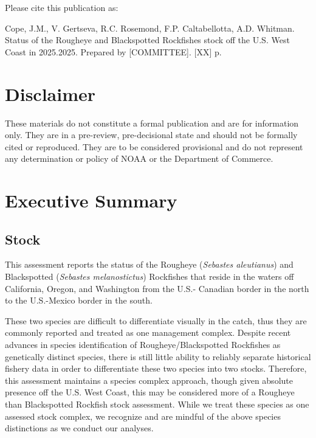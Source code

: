 \documentclass[
]{scrartcl}
\renewcommand*\contentsname{Table of contents}
\newcommand\contentsname{Table of contents}
\begin{document}
\renewcommand*\contentsname{Table of contents}
{
\hypersetup{linkcolor=}
\setcounter{tocdepth}{3}
\tableofcontents
}

\newpage{}

Please cite this publication as:

Cope, J.M., V. Gertseva, R.C. Rosemond, F.P. Caltabellotta, A.D.
Whitman. Status of the Rougheye and Blackspotted Rockfishes stock off
the U.S. West Coast in 2025.2025. Prepared by {[}COMMITTEE{]}. {[}XX{]}
p.

\newpage{}

\section*{Disclaimer}\label{disclaimer}

These materials do not constitute a formal publication and are for
information only. They are in a pre-review, pre-decisional state and
should not be formally cited or reproduced. They are to be considered
provisional and do not represent any determination or policy of NOAA or
the Department of Commerce.

\newpage{}

\setcounter{page}{1}

\renewcommand{\thetable}{\roman{table}}
\renewcommand{\thefigure}{\roman{figure}}

\setlength\parskip{0.5em plus 0.1em minus 0.2em}

\section{Executive Summary}\label{executive-summary}

\subsection{Stock}\label{stock}

This assessment reports the status of the Rougheye (\emph{Sebastes
aleutianus}) and Blackspotted (\emph{Sebastes melanostictus}) Rockfishes
that reside in the waters off California, Oregon, and Washington from
the U.S.- Canadian border in the north to the U.S.-Mexico border in the
south.

These two species are difficult to differentiate visually in the catch,
thus they are commonly reported and treated as one management complex.
Despite recent advances in species identification of
Rougheye/Blackspotted Rockfishes as genetically distinct species, there
is still little ability to reliably separate historical fishery data in
order to differentiate these two species into two stocks. Therefore,
this assessment maintains a species complex approach, though given
absolute presence off the U.S. West Coast, this may be considered more
of a Rougheye than Blackspotted Rockfish stock assessment. While we
treat these species as one assessed stock complex, we recognize and are
mindful of the above species distinctions as we conduct our analyses.
\end{document}
